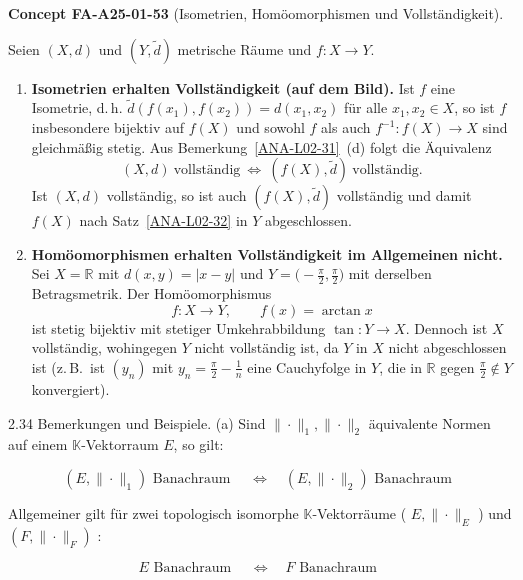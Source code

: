 \documentclass[10pt, letterpaper]{article}
\newcommand{\CustomHeading}[3]{%
  \par\medskip\noindent%
  \textbf{#1 #2} \textnormal{(#3)}.\enskip%
}
\newenvironment{CONC}[2]{\begin{unitbox}\CustomHeading{Concept}{#1}{#2}}{\end{unitbox}}
\begin{document}
\begin{CONC}{FA-A25-01-53}{Isometrien, Homöomorphismen und Vollständigkeit}
Seien $(X,d)$ und $(Y,\tilde d)$ metrische Räume und $f:X\to Y$.

\begin{enumerate}
\item[(a)] \textbf{Isometrien erhalten Vollständigkeit (auf dem Bild).}
Ist $f$ eine Isometrie, d.\,h. $\tilde d(f(x_1),f(x_2))=d(x_1,x_2)$ für alle $x_1,x_2\in X$, so ist $f$ insbesondere bijektiv auf $f(X)$ und sowohl $f$ als auch $f^{-1}:f(X)\to X$ sind gleichmäßig stetig. Aus Bemerkung~\ref{ANA-L02-31}~(d) folgt die Äquivalenz
\[
(X,d)\ \text{vollständig}\ \Longleftrightarrow\ (f(X),\tilde d)\ \text{vollständig}.
\]
Ist $(X,d)$ vollständig, so ist auch $(f(X),\tilde d)$ vollständig und damit $f(X)$ nach Satz~\ref{ANA-L02-32} in $Y$ abgeschlossen.

\item[(b)] \textbf{Homöomorphismen erhalten Vollständigkeit im Allgemeinen nicht.}
Sei $X=\mathbb{R}$ mit $d(x,y)=|x-y|$ und $Y=\bigl(-\frac{\pi}{2},\frac{\pi}{2}\bigr)$ mit derselben Betragsmetrik. Der Homöomorphismus
\[
f:X\to Y,\qquad f(x)=\arctan x
\]
ist stetig bijektiv mit stetiger Umkehrabbildung $\tan:Y\to X$. Dennoch ist $X$ vollständig, wohingegen $Y$ nicht vollständig ist, da $Y$ in $X$ nicht abgeschlossen ist (z.\,B.\ ist $(y_n)$ mit $y_n=\frac{\pi}{2}-\frac1n$ eine Cauchyfolge in $Y$, die in $\mathbb{R}$ gegen $\frac{\pi}{2}\notin Y$ konvergiert).
\end{enumerate}
\end{CONC}


2.34 Bemerkungen und Beispiele. (a) Sind $\|\cdot\|_{1},\|\cdot\|_{2}$ äquivalente Normen auf einem $\mathbb{K}$-Vektorraum $E$, so gilt:

$$
\left(E,\|\cdot\|_{1}\right) \text { Banachraum } \quad \Longleftrightarrow \quad\left(E,\|\cdot\|_{2}\right) \text { Banachraum }
$$

Allgemeiner gilt für zwei topologisch isomorphe $\mathbb{K}$-Vektorräume ( $E,\|\cdot\|_{E}$ ) und $\left(F,\|\cdot\|_{F}\right)$ :

$$
E \text { Banachraum } \quad \Longleftrightarrow \quad F \text { Banachraum }
$$
\end{document}
